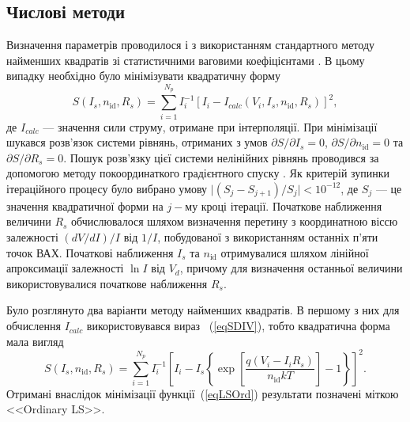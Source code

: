\subsection{Числові методи}
Визначення параметрів проводилося і з використанням стандартного методу найменших квадратів зі статистичними ваговими коефіцієнтами \cite[с.~67]{KalitkinBook}.
В цьому випадку необхідно було мінімізувати квадратичну форму
\begin{equation}
\label{eqLS}
S(I_s,n_\mathrm{id},R_s)=\sum_{i=1}^{N_p}I_i^{-1}\left[I_i-I_{calc}(V_i,I_s,n_\mathrm{id},R_s)\right]^2,
\end{equation}
де $I_{calc}$ --- значення сили струму, отримане при інтерполяції.
При мінімізації шукався розв'язок системи рівнянь, отриманих з умов $\partial S/\partial I_s=0$,
$\partial S/\partial n_\mathrm{id}=0$ та $\partial S/\partial R_s=0$.
Пошук розв'язку цієї системи нелінійних рівнянь проводився за допомогою методу покоординаткого градієнтного спуску \cite[с.~231]{KalitkinBook}.
Як критерій зупинки ітераційного процесу було вибрано умову $\mid(S_j-S_{j+1})/S_j\mid<10^{-12}$,
де $S_j$ --- це значення квадратичної форми на $j-$му кроці ітерації.
Початкове наближення величини $R_s$ обчислювалося шляхом визначення перетину з координатною віссю залежності $(dV/dI)/I$ від $1/I$,
побудованої з використанням останніх п'яти точок ВАХ.
Початкові наближення $I_s$ та $n_\mathrm{id}$ отримувалися шляхом лінійної апроксимації залежності $\ln I$ від $V_d$, причому для визначення останньої величини використовувалися початкове наближення  $R_s$.

Було розглянуто два варіанти методу найменших квадратів.
В першому з них для обчислення $I_{calc}$ використовувався вираз ~(\ref{eqSDIV}), тобто квадратична форма мала вигляд
\begin{equation}
\label{eqLSOrd}
S(I_s,n_\mathrm{id},R_s)=\sum_{i=1}^{N_p}I_i^{-1}\left[I_i-I_s\left\{\exp\left[\frac{q(V_i-I_iR_s)}{n_\mathrm{id}kT}\right]-1\right\}\right]^2.
\end{equation}
Отримані внаслідок мінімізації функції~(\ref{eqLSOrd}) результати позначені міткою <<Ordinary LS>>.

